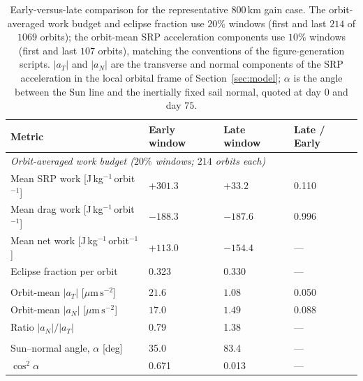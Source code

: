 \begin{table}[htbp]
\centering
\caption{Early-versus-late comparison for the representative \(800\,\mathrm{km}\) gain case. The orbit-averaged work budget and eclipse fraction use \(20\%\) windows (first and last \(214\) of \(1069\) orbits); the orbit-mean SRP acceleration components use \(10\%\) windows (first and last \(107\) orbits), matching the conventions of the figure-generation scripts. \(|a_T|\) and \(|a_N|\) are the transverse and normal components of the SRP acceleration in the local orbital frame of Section~\ref{sec:model}; \(\alpha\) is the angle between the Sun line and the inertially fixed sail normal, quoted at day \(0\) and day \(75\).}
\label{tab:gaincase_earlylate_comparison}
\small
\begin{tabular}{p{5.8cm} p{1.9cm} p{1.9cm} p{1.8cm}}
\toprule
Metric & Early window & Late window & Late / Early \\
\midrule
\multicolumn{4}{l}{\textit{Orbit-averaged work budget (\(20\%\) windows; \(214\) orbits each)}} \\
Mean SRP work [J\,kg\(^{-1}\)\,orbit\(^{-1}\)]
& \(+301.3\)
& \(+33.2\)
& 0.110 \\

Mean drag work [J\,kg\(^{-1}\)\,orbit\(^{-1}\)]
& \(-188.3\)
& \(-187.6\)
& 0.996 \\

Mean net work [J\,kg\(^{-1}\)\,orbit\(^{-1}\)]
& \(+113.0\)
& \(-154.4\)
& --- \\

Eclipse fraction per orbit
& 0.323
& 0.330
& --- \\

\addlinespace
\multicolumn{4}{l}{\textit{SRP acceleration projection (\(10\%\) windows; \(107\) orbits each)}} \\
Orbit-mean \(\left|a_T\right|\) [\(\mu\mathrm{m\,s^{-2}}\)]
& \(21.6\)
& \(1.08\)
& 0.050 \\

Orbit-mean \(\left|a_N\right|\) [\(\mu\mathrm{m\,s^{-2}}\)]
& \(17.0\)
& \(1.49\)
& 0.088 \\

Ratio \(\left|a_N\right|/\left|a_T\right|\)
& 0.79
& 1.38
& --- \\

\addlinespace
\multicolumn{4}{l}{\textit{Sun--normal geometry (day \(0\) and day \(75\))}} \\
Sun--normal angle, \(\alpha\) [deg]
& 35.0
& 83.4
& --- \\

\(\cos^2\alpha\)
& 0.671
& 0.013
& --- \\
\bottomrule
\end{tabular}
\end{table}

